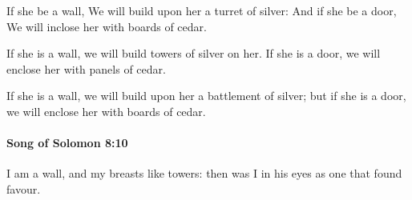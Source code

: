 			\begin{versebox}
					\item[BHS] 
					\item[LXX] 
					\item[ASV] If she be a wall, We will build upon her a turret of silver: And if she be a door, We will inclose her with boards of cedar.
					\item[NIV] If she is a wall, we will build towers of silver on her. If she is a door, we will enclose her with panels of cedar.
					\item[NRSV] If she is a wall, we will build upon her a battlement of silver; but if she is a door, we will enclose her with boards of cedar.
			\end{versebox}

		\paragraph{Song of Solomon 8:10} %
			\label{SONGOFSOLOMON-8-10}

			I am a wall, and my breasts like towers: then was I in his eyes as one that found favour.


